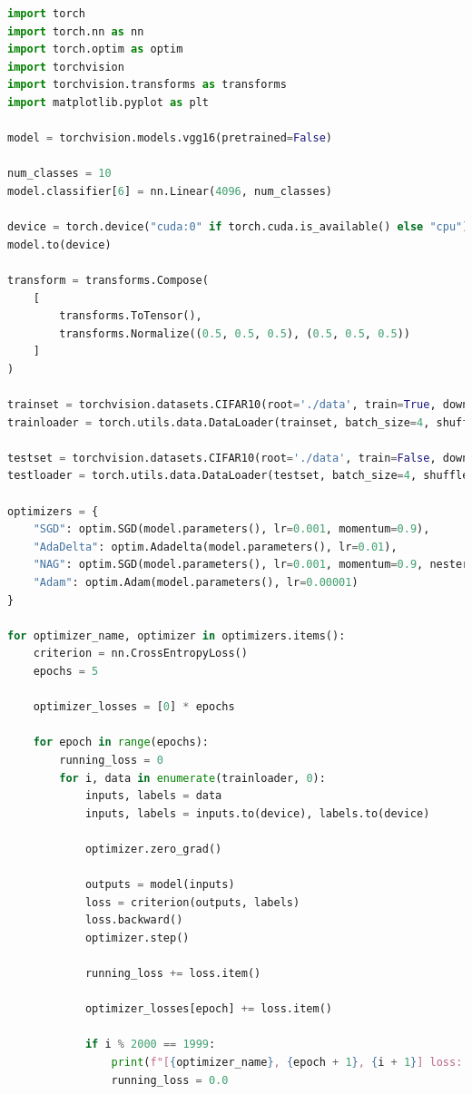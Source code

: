 \documentclass[a4paper, 14pt]{extarticle}
\begin{document}
\begin{lstlisting}[language={python},caption={VGG16},label={lst:code2}]
import torch
import torch.nn as nn
import torch.optim as optim
import torchvision
import torchvision.transforms as transforms
import matplotlib.pyplot as plt

model = torchvision.models.vgg16(pretrained=False)

num_classes = 10
model.classifier[6] = nn.Linear(4096, num_classes)

device = torch.device("cuda:0" if torch.cuda.is_available() else "cpu")
model.to(device)

transform = transforms.Compose(
    [
        transforms.ToTensor(),
        transforms.Normalize((0.5, 0.5, 0.5), (0.5, 0.5, 0.5))
    ]
)

trainset = torchvision.datasets.CIFAR10(root='./data', train=True, download=True, transform=transform)
trainloader = torch.utils.data.DataLoader(trainset, batch_size=4, shuffle=True, num_workers=2)

testset = torchvision.datasets.CIFAR10(root='./data', train=False, download=True, transform=transform)
testloader = torch.utils.data.DataLoader(testset, batch_size=4, shuffle=False, num_workers=2)

optimizers = {
    "SGD": optim.SGD(model.parameters(), lr=0.001, momentum=0.9),
    "AdaDelta": optim.Adadelta(model.parameters(), lr=0.01),
    "NAG": optim.SGD(model.parameters(), lr=0.001, momentum=0.9, nesterov=True),
    "Adam": optim.Adam(model.parameters(), lr=0.00001)
}

for optimizer_name, optimizer in optimizers.items():
    criterion = nn.CrossEntropyLoss()
    epochs = 5

    optimizer_losses = [0] * epochs

    for epoch in range(epochs):
        running_loss = 0
        for i, data in enumerate(trainloader, 0):
            inputs, labels = data
            inputs, labels = inputs.to(device), labels.to(device)

            optimizer.zero_grad()

            outputs = model(inputs)
            loss = criterion(outputs, labels)
            loss.backward()
            optimizer.step()

            running_loss += loss.item()

            optimizer_losses[epoch] += loss.item()

            if i % 2000 == 1999:
                print(f"[{optimizer_name}, {epoch + 1}, {i + 1}] loss: {running_loss / 2000}")
                running_loss = 0.0


\end{lstlisting}
\end{document}
